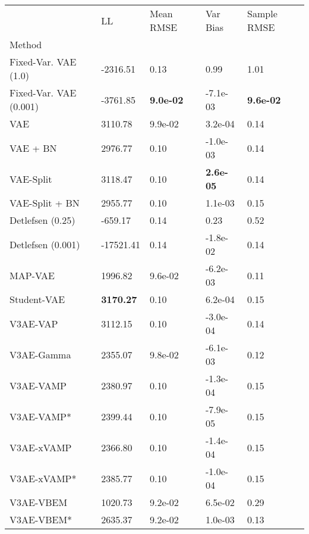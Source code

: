 \begin{tabular}{lllll}
\toprule
{} &                LL &         Mean RMSE &          Var Bias &       Sample RMSE \\
Method                 &                   &                   &                   &                   \\
\midrule
Fixed-Var. VAE (1.0)   &          -2316.51 &              0.13 &              0.99 &              1.01 \\
Fixed-Var. VAE (0.001) &          -3761.85 &  \textbf{9.0e-02} &          -7.1e-03 &  \textbf{9.6e-02} \\
VAE                    &           3110.78 &           9.9e-02 &           3.2e-04 &              0.14 \\
VAE + BN               &           2976.77 &              0.10 &          -1.0e-03 &              0.14 \\
VAE-Split              &           3118.47 &              0.10 &  \textbf{2.6e-05} &              0.14 \\
VAE-Split + BN         &           2955.77 &              0.10 &           1.1e-03 &              0.15 \\
Detlefsen (0.25)       &           -659.17 &              0.14 &              0.23 &              0.52 \\
Detlefsen (0.001)      &         -17521.41 &              0.14 &          -1.8e-02 &              0.14 \\
MAP-VAE                &           1996.82 &           9.6e-02 &          -6.2e-03 &              0.11 \\
Student-VAE            &  \textbf{3170.27} &              0.10 &           6.2e-04 &              0.15 \\
V3AE-VAP               &           3112.15 &              0.10 &          -3.0e-04 &              0.14 \\
V3AE-Gamma             &           2355.07 &           9.8e-02 &          -6.1e-03 &              0.12 \\
V3AE-VAMP              &           2380.97 &              0.10 &          -1.3e-04 &              0.15 \\
V3AE-VAMP*             &           2399.44 &              0.10 &          -7.9e-05 &              0.15 \\
V3AE-xVAMP             &           2366.80 &              0.10 &          -1.4e-04 &              0.15 \\
V3AE-xVAMP*            &           2385.77 &              0.10 &          -1.0e-04 &              0.15 \\
V3AE-VBEM              &           1020.73 &           9.2e-02 &           6.5e-02 &              0.29 \\
V3AE-VBEM*             &           2635.37 &           9.2e-02 &           1.0e-03 &              0.13 \\
\bottomrule
\end{tabular}

